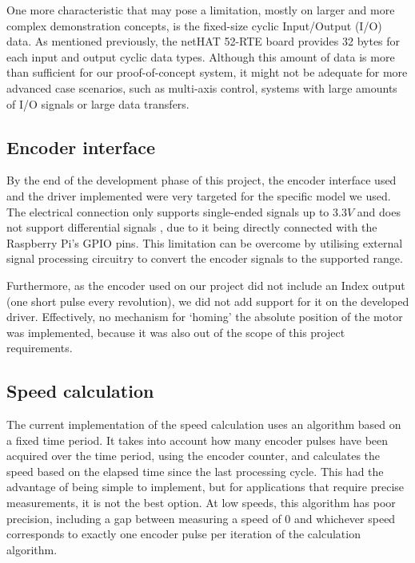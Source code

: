 One more characteristic that may pose a limitation, mostly on larger and more complex demonstration concepts, is the fixed-size cyclic Input/Output (I/O) data.
As mentioned previously, the netHAT 52-RTE board provides 32 bytes for each input and output cyclic data types.
Although this amount of data is more than sufficient for our proof-of-concept system, it might not be adequate for more advanced case scenarios, such as multi-axis control, systems with large amounts of I/O signals or large data transfers.

\subsection{Encoder interface}
By the end of the development phase of this project, the encoder interface used and the driver implemented were very targeted for the specific model we used.
The electrical connection only supports single-ended signals up to $3.3V$ and does not support differential signals \cite{technology:diff-signals}, due to it being directly connected with the Raspberry Pi's GPIO pins.
This limitation can be overcome by utilising external signal processing circuitry to convert the encoder signals to the supported range.

Furthermore, as the encoder used on our project did not include an Index output (one short pulse every revolution), we did not add support for it on the developed driver.
Effectively, no mechanism for `homing' the absolute position of the motor was implemented, because it was also out of the scope of this project requirements.

\subsection{Speed calculation}
The current implementation of the speed calculation uses an algorithm based on a fixed time period.
It takes into account how many encoder pulses have been acquired over the time period, using the encoder counter, and calculates the speed based on the elapsed time since the last processing cycle.
This had the advantage of being simple to implement, but for applications that require precise measurements, it is not the best option.
At low speeds, this algorithm has poor precision, including a gap between measuring a speed of 0 and whichever speed corresponds to exactly one encoder pulse per iteration of the calculation algorithm.


